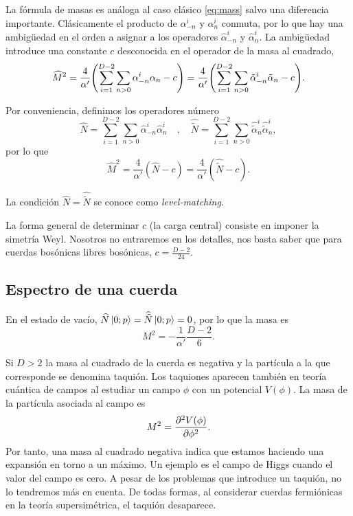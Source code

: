 La fórmula de masas es análoga al caso clásico \ref{eq:mass} salvo una diferencia importante.
Clásicamente el producto de $\alpha^i_{-n}$ y $\alpha^i_n$ conmuta, por lo que hay una 
ambigüedad en el orden a asignar a los operadores $\widehat\alpha^i_{-n}$ y $\widehat \alpha^i_n$.
La ambigüedad introduce una constante $c$ desconocida en el operador de la masa al cuadrado,
\begin{equation}
  \widehat M^2 = \frac{4}{\alpha'}\qty(\sum_{i=1}^{D-2} \sum_{n>0} \alpha_{-n}^i\alpha_n -c)
   = \frac{4}{\alpha'}\qty(\sum_{i=1}^{D-2} \sum_{n>0} \tilde \alpha_{-n}^i\tilde \alpha_n -c).
\end{equation}

Por conveniencia, definimos los operadores número
\begin{equation}
  \widehat N=\sum_{i=1}^{D-2} \sum_{n>0}\widehat \alpha_{-n}^i\widehat\alpha_n^i \quad , \quad   
  \widehat {\tilde N}=\sum_{i=1}^{D-2} \sum_{n>0} \widehat{\tilde \alpha}_n^i\widehat{ \tilde\alpha}_n^i, 
\end{equation}
por lo que 
\begin{equation}
  \widehat M^2 = \frac{4}{\alpha'} (\widehat N -c ) = \frac{4}{\alpha'} (\widehat{\tilde N} -c).
\end{equation}

La condición $\widehat N=\widehat {\tilde N}$ se conoce como \emph{level-matching}.

La forma general de determinar $c$ (la carga central) consiste en imponer la simetría Weyl.
Nosotros no entraremos en los detalles, nos basta saber que para cuerdas bosónicas libres
bosónicas, $c=\frac{D-2}{24}$.


\subsection{Espectro de una cuerda}
En el estado de vacío, $\widehat N\ket{0;p}=\widehat {\tilde N}\ket{0;p}=0$, por lo que la masa es
\begin{equation}
  M^2 = -\frac{1}{\alpha'}\frac{D-2}{6}.
\end{equation}

Si $D>2$ la masa al cuadrado de la cuerda es negativa y la partícula a la que corresponde se denomina taquión.
Los taquiones aparecen también en teoría cuántica de campos al estudiar un campo $\phi$ con un 
potencial $V(\phi)$.
La masa de la partícula asociada al campo es
\begin{equation}
  M^2 = \pdv[2]{V(\phi)}{\phi}.
\end{equation}
Por tanto, una masa al cuadrado negativa indica que estamos haciendo una expansión en torno
a un máximo. 
Un ejemplo es el campo de Higgs cuando el valor del campo es cero.
A pesar de los problemas que introduce un taquión, no lo tendremos más en cuenta. 
De todas formas, al considerar cuerdas fermiónicas en la teoría supersimétrica, el taquión
desaparece.

